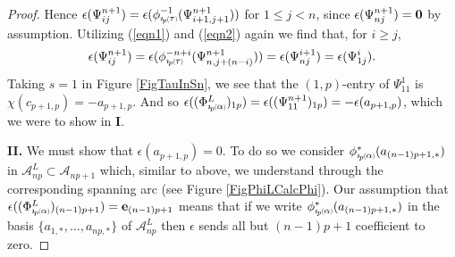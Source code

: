 \documentclass[11pt]{amsart}
\def\A{{\mathcal A}}
\newcommand*{\subsmallp}[1]{\scalebox{.5}{\ensuremath#1}}
\newcommand{\subpp}[2][p]{\imath_{\hspace*{-1pt}#1}\hspace*{-.5pt}\subsmallp(#2\subsmallp)}
\theoremstyle{definition}
\begin{document}
\begin{proof}

Hence $\epsilon(\Psi_{ij}^{n+1})=\epsilon(\phi_{\subpp\tau}^{-1}(\Psi_{i+1,j+1}^{n+1}))$ for $1\le j < n$, since $\epsilon(\Psi_{nj}^{n+1})={\bf 0}$ by assumption. Utilizing (\ref{eqn1}) and (\ref{eqn2}) again we find that, for $i\ge j$,
    \[\epsilon(\Psi_{ij}^{n+1}) = \epsilon(\phi_{\subpp\tau}^{-n+i}(\Psi_{n,j+(n-i)}^{n+1})) = \epsilon(\Psi_{nj}^{i+1}) = \epsilon(\Psi_{1j}^i).\]
Taking $s=1$ in Figure \ref{FigTauInSn}, we see that the $(1,p)$-entry of $\Psi_{11}^1$ is $\chi(c_{p+1,p})=-a_{p+1,p}$. And so $\epsilon((\Phi_{\subpp\alpha}^L)_{1p}) = \epsilon((\Psi^{n+1}_{11})_{1p}) = -\epsilon(a_{p+1,p})$, which we were to show in {\bf I}.

{\bf II.} We must show that $\epsilon(a_{p+1,p})=0$. To do so we consider $\phi^\ast_{\subpp\alpha}(a_{(n-1)p+1,\ast})$ in $\A_{np}^L\subset\A_{np+1}$ which, similar to above, we understand through the corresponding spanning arc (see Figure \ref{FigPhiLCalcPhi}). Our assumption that $\epsilon((\Phi_{\subpp\alpha}^L)_{(n-1)p+1})={\bf e}_{(n-1)p+1}$ means that if we write $\phi^\ast_{\subpp\alpha}(a_{(n-1)p+1,\ast})$ in the basis $\{a_{1,\ast},\ldots,a_{np,\ast}\}$ of $\A_{np}^L$ then $\epsilon$ sends all but $(n-1)p+1$ coefficient to zero. 


\end{proof}
\end{document}
